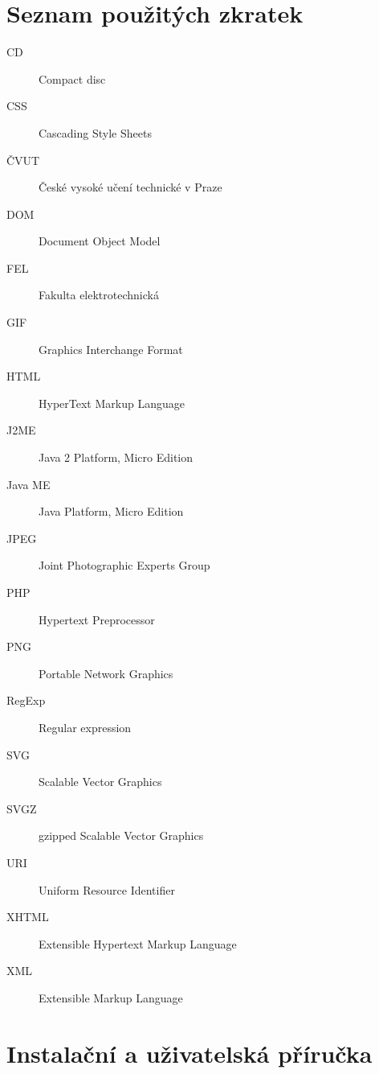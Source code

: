 \chapter{Seznam použitých zkratek}

\begin{description}
\item[CD] Compact disc
\item[CSS] Cascading Style Sheets
\item[ČVUT] České vysoké učení technické v Praze
\item[DOM] Document Object Model
\item[FEL] Fakulta elektrotechnická
\item[GIF] Graphics Interchange Format
\item[HTML] HyperText Markup Language
\item[J2ME] Java 2 Platform, Micro Edition
\item[Java ME] Java Platform, Micro Edition
\item[JPEG] Joint Photographic Experts Group
\item[PHP] Hypertext Preprocessor
\item[PNG] Portable Network Graphics
\item[RegExp] Regular expression
\item[SVG] Scalable Vector Graphics
\item[SVGZ] gzipped Scalable Vector Graphics
\item[URI] Uniform Resource Identifier
\item[XHTML] Extensible Hypertext Markup Language
\item[XML] Extensible Markup Language
\end{description}


\chapter{Instalační a uživatelská příručka}

